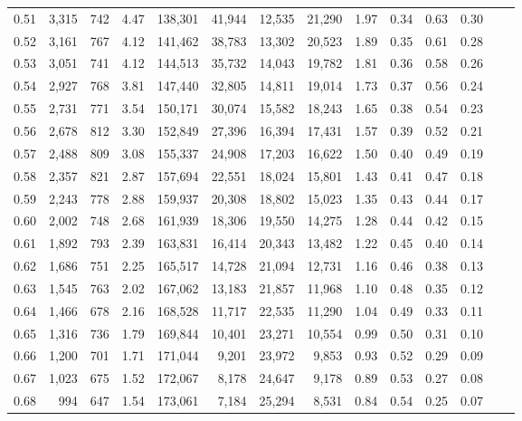 \begin{tabular}{rrrrrrrrrrrrrr}
0.51 &  3,315 &  742 &    4.47 &  138,301 &   41,944 &  12,535 &  21,290 &  1.97 &  0.34 &  0.63 &      0.30 \\
0.52 &  3,161 &  767 &    4.12 &  141,462 &   38,783 &  13,302 &  20,523 &  1.89 &  0.35 &  0.61 &      0.28 \\
0.53 &  3,051 &  741 &    4.12 &  144,513 &   35,732 &  14,043 &  19,782 &  1.81 &  0.36 &  0.58 &      0.26 \\
0.54 &  2,927 &  768 &    3.81 &  147,440 &   32,805 &  14,811 &  19,014 &  1.73 &  0.37 &  0.56 &      0.24 \\
0.55 &  2,731 &  771 &    3.54 &  150,171 &   30,074 &  15,582 &  18,243 &  1.65 &  0.38 &  0.54 &      0.23 \\
0.56 &  2,678 &  812 &    3.30 &  152,849 &   27,396 &  16,394 &  17,431 &  1.57 &  0.39 &  0.52 &      0.21 \\
0.57 &  2,488 &  809 &    3.08 &  155,337 &   24,908 &  17,203 &  16,622 &  1.50 &  0.40 &  0.49 &      0.19 \\
0.58 &  2,357 &  821 &    2.87 &  157,694 &   22,551 &  18,024 &  15,801 &  1.43 &  0.41 &  0.47 &      0.18 \\
0.59 &  2,243 &  778 &    2.88 &  159,937 &   20,308 &  18,802 &  15,023 &  1.35 &  0.43 &  0.44 &      0.17 \\
0.60 &  2,002 &  748 &    2.68 &  161,939 &   18,306 &  19,550 &  14,275 &  1.28 &  0.44 &  0.42 &      0.15 \\
0.61 &  1,892 &  793 &    2.39 &  163,831 &   16,414 &  20,343 &  13,482 &  1.22 &  0.45 &  0.40 &      0.14 \\
0.62 &  1,686 &  751 &    2.25 &  165,517 &   14,728 &  21,094 &  12,731 &  1.16 &  0.46 &  0.38 &      0.13 \\
0.63 &  1,545 &  763 &    2.02 &  167,062 &   13,183 &  21,857 &  11,968 &  1.10 &  0.48 &  0.35 &      0.12 \\
0.64 &  1,466 &  678 &    2.16 &  168,528 &   11,717 &  22,535 &  11,290 &  1.04 &  0.49 &  0.33 &      0.11 \\
0.65 &  1,316 &  736 &    1.79 &  169,844 &   10,401 &  23,271 &  10,554 &  0.99 &  0.50 &  0.31 &      0.10 \\
0.66 &  1,200 &  701 &    1.71 &  171,044 &    9,201 &  23,972 &   9,853 &  0.93 &  0.52 &  0.29 &      0.09 \\
0.67 &  1,023 &  675 &    1.52 &  172,067 &    8,178 &  24,647 &   9,178 &  0.89 &  0.53 &  0.27 &      0.08 \\
0.68 &    994 &  647 &    1.54 &  173,061 &    7,184 &  25,294 &   8,531 &  0.84 &  0.54 &  0.25 &      0.07 \\

\end{tabular}
